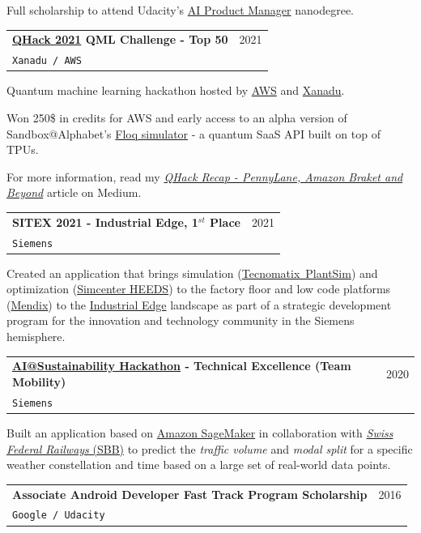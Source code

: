 \documentclass[letterpaper,11pt]{article}
\makeatletter
\newcommand{\resumeSubheading}[4]{
  \vspace{-2pt}\item
    \begin{tabular*}{0.97\textwidth}[t]{l@{\extracolsep{\fill}}r}
      \textbf{#1} & #2 \\
      \texttt{\small#3} & \textit{\small #4} \\
    \end{tabular*}\vspace{-7pt}
}
\makeatother
\begin{document}
    Full scholarship to attend Udacity's \href{https://www.udacity.com/course/ai-product-manager-nanodegree--nd088}{AI Product Manager} nanodegree.
    \vspace{2mm}
    \resumeSubheading
      {\href{https://github.com/XanaduAI/QHack2021}{QHack 2021} QML Challenge - Top 50}{2021}
      {Xanadu / AWS}{}
    \vspace{3mm}
    
    Quantum machine learning hackathon hosted by \href{https://aws.amazon.com/}{AWS} and \href{https://www.xanadu.ai/}{Xanadu}.
    
    Won 250\$ in credits for AWS and early access to an alpha version of Sandbox@Alphabet's \href{https://venturebeat.com/2021/03/10/alphabet-is-repurposing-google-tpus-for-quantum-computing-simulations/}{Floq simulator}  - a quantum SaaS API built on top of TPUs.

    For more information, read my \textit{\href{https://medium.com/@joao.galego/qhack-recap-pennylane-amazon-braket-and-beyond-a2c153d50a88}{QHack Recap - PennyLane, Amazon Braket and Beyond}} article on Medium.
    \vspace{2mm}
    \resumeSubheading
      {SITEX 2021 - Industrial Edge, 1$^{st}$ Place}{2021}
      {Siemens}{}
    \vspace{3mm}
    
    Created an application that brings simulation (\href{https://www.plm.automation.siemens.com/global/en/products/manufacturing-planning/plant-simulation-throughput-optimization.html}{Tecnomatix\textregistered~PlantSim}) and optimization (\href{https://www.plm.automation.siemens.com/global/pt/products/simcenter/simcenter-heeds.html}{Simcenter HEEDS}) to the factory floor  and low code platforms (\href{https://www.mendix.com/}{Mendix}) to the \href{https://new.siemens.com/global/en/products/automation/topic-areas/industrial-edge.html}{Industrial Edge} landscape as part of a strategic development program for the innovation and technology community in the Siemens hemisphere.
    \vspace{2mm}
    \resumeSubheading
      {\href{https://ecosystem.siemens.com/ai-hackathon}{AI@Sustainability Hackathon} - Technical Excellence (Team Mobility)}{2020}
      {Siemens}{}
    \vspace{3mm}

    Built an application based on \href{https://aws.amazon.com/sagemaker/}{Amazon SageMaker} in collaboration with \href{https://www.sbb.ch/}{\emph{Swiss Federal Railways} (SBB)}  to predict the \emph{traffic volume} and \emph{modal split} for a specific weather constellation and time based on a large set of real-world data points.
    \vspace{2mm}
    \resumeSubheading
      {Associate Android Developer Fast Track Program Scholarship}{2016}
      {Google / Udacity}{}
    \vspace{3mm}
\end{document}

